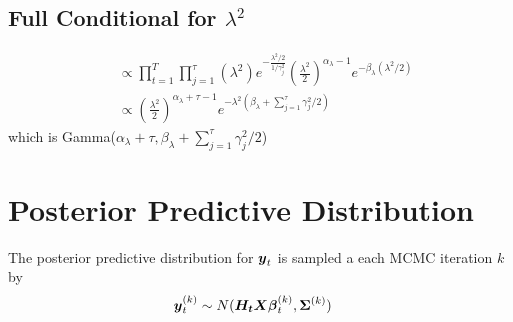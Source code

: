 \documentclass[fleqn]{article}
\def\bm#1{\mbox{\boldmath $#1$}}
\begin{document}
\subsection*{Full Conditional for $\lambda^2$}
%
\begin{align*}
[\lambda^2 | \cdot] & \propto \prod_{t = 1}^T \prod_{j = 1}^\tau (\lambda^2) e^{ - \frac{\lambda^2 / 2} {1 / \gamma^2_j}} (\frac{\lambda^2} {2})^{\alpha_\lambda - 1} e^{ - \beta_\lambda (\lambda^2 /2)}\\
%
& \propto (\frac{\lambda^2} {2})^{\alpha_\lambda + \tau - 1} e^{ - \lambda^2(\beta_\lambda + \sum_{j = 1}^\tau \gamma^2_j / 2)}
\end{align*}
%
which is Gamma($\alpha_\lambda + \tau, \beta_\lambda + \sum_{j = 1}^\tau \gamma^2_j / 2$)
%
\section{Posterior Predictive Distribution}
%
The posterior predictive distribution for $\bm{y}_t$ is sampled a each MCMC iteration $k$ by
\begin{align*}
  \bm{y}^{(k)}_t & \sim N(\bm{H_t} \bm{X} \bm{\beta}^{(k)}_t, \bm{\Sigma}^{(k)})
\end{align*}
\end{document}
